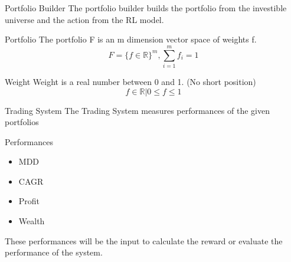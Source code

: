\begin{frame}{Portfolio Builder}
The portfolio builder builds the portfolio from the investible universe and the action from the RL model.
\\
\begin{block}{Portfolio}
The portfolio F is an m dimension vector space of weights f.
\[
    F = \{ {f \in \mathbb{R} } \} ^m,
    \sum_{i=1}^m {f_i} =1
\]
\end{block}
\begin{block}{Weight}
Weight is a real number between 0 and 1. \alert{(No short position)}
\[
    f \in \mathbb{R} | 0 \leq f \leq 1 
\]
\end{block}
\end{frame}




\begin{frame}{Trading System}
The Trading System measures performances of the given portfolios
\begin{block}{Performances}
\begin{itemize}
    \item MDD
    \item CAGR
    \item Profit
    \item Wealth
\end{itemize}
\end{block}
These performances will be the input to calculate the reward or evaluate the performance of the system. 
\end{frame}